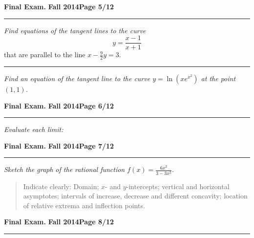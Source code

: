\documentclass[12pt]{article}
\begin{document}
\newpage

\hfill{\large\bf Final Exam.}\hfill{\large\bf
  Fall 2014}\hfill{\large\bf Page 5/12}\hrule

\bigskip
{\problem[15 pts] \em Find equations of the tangent lines to the curve}
\begin{equation*}
  y = \frac{x-1}{x+1}
\end{equation*}
that are parallel to the line $x-\tfrac{9}{2} y=3$.
\vspace{10cm}
\hrule

{\problem[15 pts] \em Find an equation of the tangent line to the curve
$y=\ln( x e^{x^2})$ at the point $(1,1)$.}

\newpage

\hfill{\large\bf Final Exam.}\hfill{\large\bf
  Fall 2014}\hfill{\large\bf Page 6/12}\hrule

\bigskip
{\problem[20 pts] \em  Evaluate each limit:} 

\bigskip
{}

\vspace{9cm}

\newpage

\hfill{\large\bf Final Exam.}\hfill{\large\bf
  Fall 2014}\hfill{\large\bf Page 7/12}\hrule

\bigskip
{\problem[30 pts] \em Sketch the graph of the rational function $f(x)
  = \displaystyle{\frac{6x^2}{3-3x^2}}$.}
\begin{quotation}
Indicate clearly: Domain; $x$- and $y$-intercepts; vertical and horizontal asymptotes; intervals of increase, decrease and different concavity; location of relative extrema and inflection points.
\end{quotation}
\newpage

\hfill{\large\bf Final Exam.}\hfill{\large\bf
  Fall 2014}\hfill{\large\bf Page 8/12}\hrule
\end{document}

